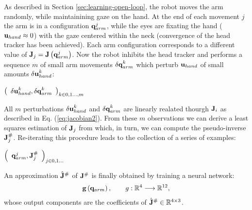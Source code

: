 As described in Section \ref{sec:learning-open-loop}, the robot 
moves the arm randomly, while maintainining gaze on the hand. At 
the end of each movement $j$ the arm is in a configuration 
$\mathbf q_{arm}^j$,  while the eyes are fixating the hand 
($\mathbf{u}_{hand} \approx 0$) with the gaze centered within the neck 
(convergence of the head tracker has been achieved). Each 
arm configuration corresponds to a different value of 
$\mathbf J_j=\mathbf J\left(\mathbf q_{arm}^j\right)$. 
Now the robot inhibits the head tracker and performs a sequence $m$
of small arm movements $\mathbf {\delta q}_{arm}^k$ which perturb 
$\mathbf{u}_{hand}$ of small amounts $\mathbf {\delta u}_{hand}^k$:
%
\begin{center}
\begin{math}
  \left(\begin{array}{cc}
    \mathbf {\delta u}_{hand}^k , 
	\mathbf {\delta q}_{arm}^k \end{array}
  \right)_{k \in 0,1\dots,m}
\end{math}
\end{center}
%
All $m$ perturbations $\mathbf {\delta u}_{hand}^k$ and 
$\mathbf {\delta q}_{arm}^k$ are linearly realated thourgh $\mathbf J_i$ 
as described in Eq. (\ref{eq:jacobian2}). From these $m$ 
observations we can derive a least squares estimation of $\mathbf J_j$ from 
which, in turn, we can compute the pseudo-inverse $\mathbf J_j^\#$. 
Re-iterating this procedure leads to the collection of a series of examples:
%
\begin{center}
\begin{math}
  \left(\begin{array}{cc}
    \mathbf q_{arm}^j , \mathbf J_j^\# \end{array}\right)_{j \in 0,1\dots}
\end{math}
\end{center}
%
An approximation $\hat{\mathbf J}^\#$ of $\mathbf J^\#$ is finally
obtained by training a neural network:
%
\begin{equation}
\mathbf{g}\left(\mathbf q_{arm}\right), \qquad g : \mathbb R^4 \longrightarrow \mathbb R^{12},
\end{equation}
%
whose output components are the coefficients of 
$\hat{\mathbf J}^\# \in \mathbb R^{4 \times 3}$.
%

